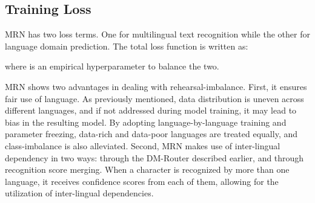 \documentclass[10pt,twocolumn,letterpaper]{article}
\begin{document}
\subsection{Training Loss}
MRN has two loss terms. One for multilingual text recognition while the other for language domain prediction. The total loss function is written as:

where  is an empirical hyperparameter to balance the two.


MRN shows two advantages in dealing with rehearsal-imbalance. First, it ensures fair use of language. As previously mentioned, data distribution is uneven across different languages, and if not addressed during model training, it may lead to bias in the resulting model. By adopting language-by-language training and parameter freezing, data-rich and data-poor languages are treated equally, and class-imbalance is also alleviated. Second, MRN makes use of inter-lingual dependency in two ways: through the DM-Router described earlier, and through recognition score merging. When a character is recognized by more than one language, it receives confidence scores from each of them, allowing for the utilization of inter-lingual dependencies. 


\begin{table}[]
\begin{center}
\end{center}
\caption{MLT17 and MLT19 statistics in our experiments.}
\label{table:mlt_datasets}
\end{table}
\end{document}
